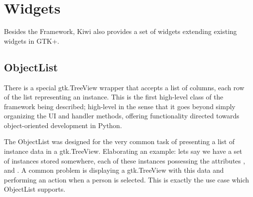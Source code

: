 \documentclass[a4paper]{howto}
\begin{document}
\section{Widgets}

Besides the Framework, Kiwi also provides a set of widgets extending
existing widgets in GTK+.







\subsection{ObjectList}

There is a special gtk.TreeView wrapper that accepts a list of columns,
each row of the list representing an instance. This is the first
high-level class of the framework being described; high-level in the
sense that it goes beyond simply organizing the UI and handler methods,
offering functionality directed towards object-oriented development in
Python.

The ObjectList was designed for the very common task of presenting a
list of instance data in a gtk.TreeView. Elaborating an example: lets say we
have a set of  instances stored somewhere, each of these
instances possessing the attributes ,  and
. A common problem is displaying a gtk.TreeView with this data
and performing an action when a person is selected. This is exactly the
use case which ObjectList supports.
\end{document}
